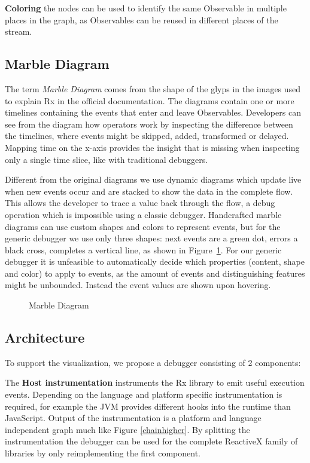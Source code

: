 \textbf{Coloring} the nodes can be used to identify the same Observable in multiple places in the graph, as Observables can be reused in different places of the stream.

\subsection{Marble Diagram}
The term \textit{Marble Diagram} comes from the shape of the glyps in the images used to explain Rx in the official documentation. The diagrams contain one or more timelines containing the events that enter and leave Observables. Developers can see from the diagram how operators work by inspecting the difference between the timelines, where events might be skipped, added, transformed or delayed. Mapping time on the x-axis provides the insight that is missing when inspecting only a single time slice, like with traditional debuggers.

Different from the original diagrams we use dynamic diagrams which update live when new events occur and are stacked to show the data in the complete flow. This allows the developer to trace a value back through the flow, a debug operation which is impossible using a classic debugger. Handcrafted marble diagrams can use custom shapes and colors to represent events, but for the generic debugger we use only three shapes: next events are a green dot, errors a black cross, completes a vertical line, as shown in Figure~\ref{marblediagram}. For our generic debugger it is unfeasible to automatically decide which properties (content, shape and color) to apply to events, as the amount of events and distinguishing features might be unbounded. Instead the event values are shown upon hovering.

\begin{figure}[ht]
	\centering
	
	\caption{Marble Diagram}
	\label{marblediagram}
\end{figure} 

\subsection{Architecture}
To support the visualization, we propose a debugger consisting of 2 components:

The \textbf{Host instrumentation} instruments the Rx library to emit useful execution events. Depending on the language and platform specific instrumentation is required, for example the JVM provides different hooks into the runtime than JavaScript. Output of the instrumentation is a platform and language independent graph much like Figure \ref{chainhigher}. By splitting the instrumentation the debugger can be used for the complete ReactiveX family of libraries by only reimplementing the first component. 

